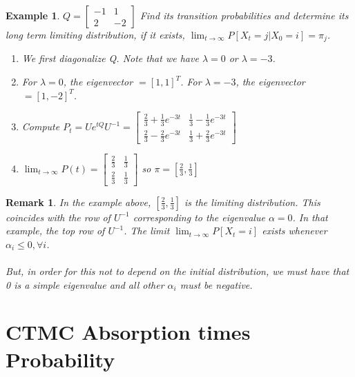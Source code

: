 \documentclass[12pt]{article}
\newtheorem*{remark}{Remark}
\newtheorem{example}{Example}
\begin{document}
\begin{example}
    $Q = \begin{bmatrix}
     -1 & 1\\
     2 & -2
    \end{bmatrix}$ Find its transition probabilities and determine its long term limiting distribution, if it exists, $\lim_{t \to \infty}P[X_t = j | X_0 = i] = \pi_j$.

    \begin{enumerate}
        \item We first diagonalize Q. Note that we have $\lambda = 0$ or $\lambda = -3$.
        \item For $\lambda = 0$, the eigenvector $= [1, 1]^T$. For $\lambda = -3$, the eigenvector $= [1, -2]^T$.
        \item Compute $P_t = Ue^{tQ}U^{-1} = \begin{bmatrix}
         \frac{2}{3}+\frac{1}{3}e^{-3t} & \frac{1}{3}-\frac{1}{3}e^{-3t}\\
         \frac{2}{3}-\frac{2}{3}e^{-3t} & \frac{1}{3}+\frac{2}{3}e^{-3t}
        \end{bmatrix}$
        \item $\lim_{t \to \infty}P(t) = \begin{bmatrix}
         \frac{2}{3} & \frac{1}{3}\\
         \frac{2}{3} & \frac{1}{3}
        \end{bmatrix}$ so $\pi = [\frac{2}{3}, \frac{1}{3}]$
    \end{enumerate}
\end{example}

\begin{remark}
    In the example above, $[\frac{2}{3}, \frac{1}{3}]$ is the limiting distribution. This coincides with the row of $U^{-1}$ corresponding to the eigenvalue $\alpha = 0$. In that example, the top row of $U^{-1}$. The limit $\lim_{t \to \infty}P[X_t = i]$ exists whenever $\alpha_i \leq 0, \forall i$.
    \\
    \\But, in order for this not to depend on the initial distribution, we must have that 0 is a simple eigenvalue and all other $\alpha_i$ must be negative.
\end{remark}

\section{CTMC Absorption times Probability}
\end{document}
